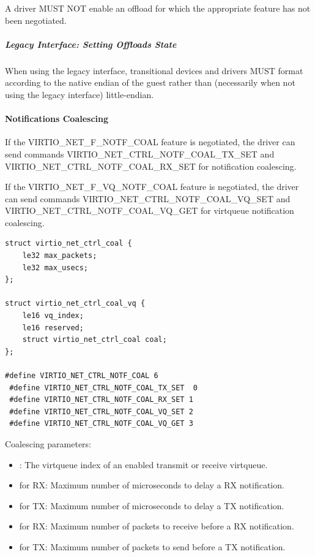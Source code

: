 A driver MUST NOT enable an offload for which the appropriate feature
has not been negotiated.

\subparagraph{Legacy Interface: Setting Offloads State}\label{sec:Device Types / Network Device / Device Operation / Control Virtqueue / Offloads State Configuration / Setting Offloads State / Legacy Interface: Setting Offloads State}
When using the legacy interface, transitional devices and drivers
MUST format 
according to the native endian of the guest rather than
(necessarily when not using the legacy interface) little-endian.


\paragraph{Notifications Coalescing}\label{sec:Device Types / Network Device / Device Operation / Control Virtqueue / Notifications Coalescing}

If the VIRTIO_NET_F_NOTF_COAL feature is negotiated, the driver can
send commands VIRTIO_NET_CTRL_NOTF_COAL_TX_SET and VIRTIO_NET_CTRL_NOTF_COAL_RX_SET
for notification coalescing.

If the VIRTIO_NET_F_VQ_NOTF_COAL feature is negotiated, the driver can
send commands VIRTIO_NET_CTRL_NOTF_COAL_VQ_SET and VIRTIO_NET_CTRL_NOTF_COAL_VQ_GET
for virtqueue notification coalescing.

\begin{lstlisting}
struct virtio_net_ctrl_coal {
    le32 max_packets;
    le32 max_usecs;
};

struct virtio_net_ctrl_coal_vq {
    le16 vq_index;
    le16 reserved;
    struct virtio_net_ctrl_coal coal;
};

#define VIRTIO_NET_CTRL_NOTF_COAL 6
 #define VIRTIO_NET_CTRL_NOTF_COAL_TX_SET  0
 #define VIRTIO_NET_CTRL_NOTF_COAL_RX_SET 1
 #define VIRTIO_NET_CTRL_NOTF_COAL_VQ_SET 2
 #define VIRTIO_NET_CTRL_NOTF_COAL_VQ_GET 3
\end{lstlisting}

Coalescing parameters:
\begin{itemize}
\item {}: The virtqueue index of an enabled transmit or receive virtqueue.
\item {} for RX: Maximum number of microseconds to delay a RX notification.
\item {} for TX: Maximum number of microseconds to delay a TX notification.
\item {} for RX: Maximum number of packets to receive before a RX notification.
\item {} for TX: Maximum number of packets to send before a TX notification.
\end{itemize}

